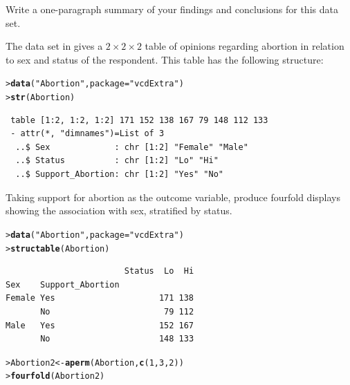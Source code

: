 \documentclass[10pt]{report}\usepackage[]{graphicx}\usepackage[]{color}
\makeatletter
\newcommand{\hlnum}[1]{\textcolor[rgb]{0.686,0.059,0.569}{#1}}%
\newcommand{\hlstr}[1]{\textcolor[rgb]{0.192,0.494,0.8}{#1}}%
\newcommand{\hlstd}[1]{\textcolor[rgb]{0.345,0.345,0.345}{#1}}%
\newcommand{\hlkwb}[1]{\textcolor[rgb]{0.69,0.353,0.396}{#1}}%
\newcommand{\hlkwc}[1]{\textcolor[rgb]{0.333,0.667,0.333}{#1}}%
\newcommand{\hlkwd}[1]{\textcolor[rgb]{0.737,0.353,0.396}{\textbf{#1}}}%
\newenvironment{kframe}{%
 \def\at@end@of@kframe{}%
 \ifinner\ifhmode%
  \def\at@end@of@kframe{\end{minipage}}%
  \begin{minipage}{\columnwidth}%
 \fi\fi%
 \def\FrameCommand##1{\hskip\@totalleftmargin \hskip-\fboxsep
 \colorbox{shadecolor}{##1}\hskip-\fboxsep
     \hskip-\linewidth \hskip-\@totalleftmargin \hskip\columnwidth}%
 \MakeFramed {\advance\hsize-\width
   \@totalleftmargin\z@ \linewidth\hsize
   \@setminipage}}%
 {\par\unskip\endMakeFramed%
 \at@end@of@kframe}
\newenvironment{knitrout}{}{} %
\renewenvironment{knitrout}{\small\renewcommand{\baselinestretch}{.85}}{} %
\makeatother
\begin{document}
\begin{Exercises}
\begin{enumerate*}
    \item Write a one-paragraph summary of your findings and conclusions for this data set.
    \begin{ans}
    \end{ans}
    
  \end{enumerate*}

  \exercise The data set  in  gives a $2 \times 2 \times 2$
  table of opinions regarding abortion in relation to sex and status of the
  respondent. This table has the following structure:
\begin{knitrout}\footnotesize
{}\color{fgcolor}\begin{kframe}
\begin{alltt}
\hlstd{> }\hlkwd{data}\hlstd{(}\hlstr{"Abortion"}\hlstd{,} \hlkwc{package} \hlstd{=} \hlstr{"vcdExtra"}\hlstd{)}
\hlstd{> }\hlkwd{str}\hlstd{(Abortion)}
\end{alltt}
\begin{verbatim}
 table [1:2, 1:2, 1:2] 171 152 138 167 79 148 112 133
 - attr(*, "dimnames")=List of 3
  ..$ Sex             : chr [1:2] "Female" "Male"
  ..$ Status          : chr [1:2] "Lo" "Hi"
  ..$ Support_Abortion: chr [1:2] "Yes" "No"
\end{verbatim}
\end{kframe}
\end{knitrout}
  \begin{enumerate*}
    \item Taking support for abortion as the outcome variable, produce fourfold displays   
    showing the association with sex, stratified by status.
    \begin{ans}
\begin{knitrout}\footnotesize
{}\color{fgcolor}\begin{kframe}
\begin{alltt}
\hlstd{> }\hlkwd{data}\hlstd{(}\hlstr{"Abortion"}\hlstd{,} \hlkwc{package}\hlstd{=}\hlstr{"vcdExtra"}\hlstd{)}
\hlstd{> }\hlkwd{structable}\hlstd{(Abortion)}
\end{alltt}
\begin{verbatim}
                        Status  Lo  Hi
Sex    Support_Abortion               
Female Yes                     171 138
       No                       79 112
Male   Yes                     152 167
       No                      148 133
\end{verbatim}
\begin{alltt}
\hlstd{> }\hlstd{Abortion2}\hlkwb{<-}\hlkwd{aperm}\hlstd{(Abortion,} \hlkwd{c}\hlstd{(}\hlnum{1}\hlstd{,}\hlnum{3}\hlstd{,}\hlnum{2}\hlstd{))}
\hlstd{> }\hlkwd{fourfold}\hlstd{(Abortion2)}
\end{alltt}
\end{kframe}


\end{knitrout}
\end{ans}
\end{enumerate*}
\end{Exercises}
\end{document}
